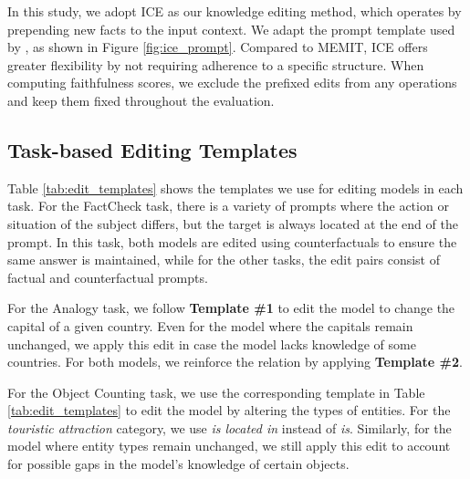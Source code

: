 In this study, we adopt ICE \citep{cohen2024evaluating} as our knowledge editing method, which operates by prepending new facts to the input context. We adapt the prompt template used by \citet{wang-etal-2024-easyedit}, as shown in Figure \ref{fig:ice_prompt}. Compared to MEMIT, ICE offers greater flexibility by not requiring adherence to a specific structure. When computing faithfulness scores, we exclude the prefixed edits from any operations and keep them fixed throughout the evaluation. 

\subsection{Task-based Editing Templates}
\label{appendix:edit_templates}



Table \ref{tab:edit_templates} shows the templates we use for editing models in each task. For the FactCheck task, there is a variety of prompts where the action or situation of the subject differs, but the target is always located at the end of the prompt. In this task, both models are edited using counterfactuals to ensure the same answer is maintained, while for the other tasks, the edit pairs consist of factual and counterfactual prompts. 

For the Analogy task, we follow \textbf{Template \#1} to edit the model to change the capital of a given country. Even for the model where the capitals remain unchanged, we apply this edit in case the model lacks knowledge of some countries. For both models, we reinforce the  relation by applying \textbf{Template \#2}. 

For the Object Counting task, we use the corresponding template in Table \ref{tab:edit_templates} to edit the model by altering the types of entities. For the \textit{touristic attraction} category, we use \textit{is located in} instead of \textit{is}. Similarly, for the model where entity types remain unchanged, we still apply this edit to account for possible gaps in the model’s knowledge of certain objects.



